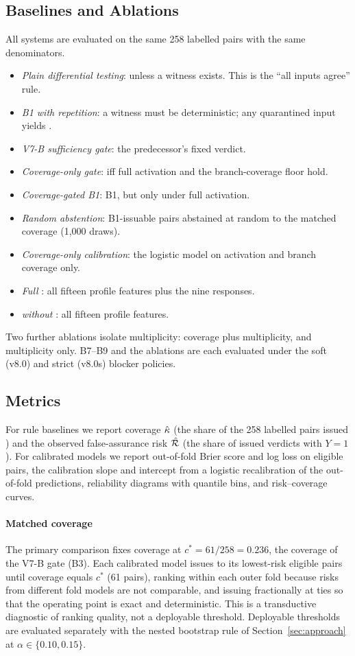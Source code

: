 \subsection{Baselines and Ablations}
All systems are evaluated on the same 258 labelled pairs with the same denominators.
\begin{itemize}
\item[B1)] \emph{Plain differential testing}: \NDO{} unless a witness exists. This is the ``all inputs agree'' rule.
\item[B2)] \emph{B1 with repetition}: a witness must be deterministic; any quarantined input yields \INS{}.
\item[B3)] \emph{V7-B sufficiency gate}: the predecessor's fixed verdict.
\item[B4)] \emph{Coverage-only gate}: \NDO{} iff full activation and the branch-coverage floor hold.
\item[B5)] \emph{Coverage-gated B1}: B1, but \NDO{} only under full activation.
\item[B6)] \emph{Random abstention}: B1-issuable pairs abstained at random to the matched coverage (1{,}000 draws).
\item[B7)] \emph{Coverage-only calibration}: the logistic model on activation and branch coverage only.
\item[B8)] \emph{Full \cec{}}: all fifteen profile features plus the nine \ers{} responses.
\item[B9)] \emph{\cec{} without \ers{}}: all fifteen profile features.
\end{itemize}
Two further ablations isolate multiplicity: coverage plus multiplicity, and multiplicity only. B7--B9 and the ablations are each evaluated under the soft (v8.0) and strict (v8.0s) blocker policies.

\subsection{Metrics}
For rule baselines we report coverage $\hat{\kappa}$ (the share of the 258 labelled pairs issued \NDO{}) and the observed false-assurance risk $\hat{\mathcal{R}}$ (the share of issued \NDO{} verdicts with $Y{=}1$). For calibrated models we report out-of-fold Brier score and log loss on eligible pairs, the calibration slope and intercept from a logistic recalibration of the out-of-fold predictions, reliability diagrams with quantile bins, and risk--coverage curves.

\paragraph*{Matched coverage} The primary comparison fixes coverage at $c^\ast = 61/258 = 0.236$, the coverage of the V7-B gate (B3). Each calibrated model issues \NDO{} to its lowest-risk eligible pairs until coverage equals $c^\ast$ (61 pairs), ranking within each outer fold because risks from different fold models are not comparable, and issuing fractionally at ties so that the operating point is exact and deterministic. This is a transductive diagnostic of ranking quality, not a deployable threshold. Deployable thresholds are evaluated separately with the nested bootstrap rule of Section~\ref{sec:approach} at $\alpha\in\{0.10,0.15\}$.

